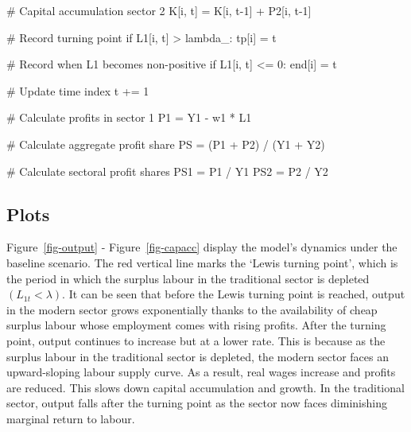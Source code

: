 \documentclass[
  letterpaper,
  DIV=11,
  numbers=noendperiod]{scrreprt}
\newenvironment{Shaded}{\begin{snugshade}}{\end{snugshade}}
\newcommand{\CommentTok}[1]{\textcolor[rgb]{0.37,0.37,0.37}{#1}}
\newcommand{\ControlFlowTok}[1]{\textcolor[rgb]{0.00,0.23,0.31}{#1}}
\newcommand{\DecValTok}[1]{\textcolor[rgb]{0.68,0.00,0.00}{#1}}
\newcommand{\NormalTok}[1]{\textcolor[rgb]{0.00,0.23,0.31}{#1}}
\newcommand{\OperatorTok}[1]{\textcolor[rgb]{0.37,0.37,0.37}{#1}}
\begin{document}
\begin{tcolorbox}
\begin{Shaded}
\begin{Highlighting}[]
            \CommentTok{\# Capital accumulation sector 2}
\NormalTok{            K[i, t] }\OperatorTok{=}\NormalTok{ K[i, t}\OperatorTok{{-}}\DecValTok{1}\NormalTok{] }\OperatorTok{+}\NormalTok{ P2[i, t}\OperatorTok{{-}}\DecValTok{1}\NormalTok{]}

        \CommentTok{\# Record turning point}
        \ControlFlowTok{if}\NormalTok{ L1[i, t] }\OperatorTok{\textgreater{}}\NormalTok{ lambda\_:}
\NormalTok{            tp[i] }\OperatorTok{=}\NormalTok{ t}

        \CommentTok{\# Record when L1 becomes non{-}positive}
        \ControlFlowTok{if}\NormalTok{ L1[i, t] }\OperatorTok{\textless{}=} \DecValTok{0}\NormalTok{:}
\NormalTok{            end[i] }\OperatorTok{=}\NormalTok{ t}

        \CommentTok{\# Update time index}
\NormalTok{        t }\OperatorTok{+=} \DecValTok{1}

\CommentTok{\# Calculate profits in sector 1}
\NormalTok{P1 }\OperatorTok{=}\NormalTok{ Y1 }\OperatorTok{{-}}\NormalTok{ w1 }\OperatorTok{*}\NormalTok{ L1}

\CommentTok{\# Calculate aggregate profit share}
\NormalTok{PS }\OperatorTok{=}\NormalTok{ (P1 }\OperatorTok{+}\NormalTok{ P2) }\OperatorTok{/}\NormalTok{ (Y1 }\OperatorTok{+}\NormalTok{ Y2)}

\CommentTok{\# Calculate sectoral profit shares}
\NormalTok{PS1 }\OperatorTok{=}\NormalTok{ P1 }\OperatorTok{/}\NormalTok{ Y1}
\NormalTok{PS2 }\OperatorTok{=}\NormalTok{ P2 }\OperatorTok{/}\NormalTok{ Y2}
\end{Highlighting}
\end{Shaded}

\end{tcolorbox}

\subsection{Plots}\label{plots-12}

Figure~\ref{fig-output} - Figure~\ref{fig-capacc} display the model's
dynamics under the baseline scenario. The red vertical line marks the
`Lewis turning point', which is the period in which the surplus labour
in the traditional sector is depleted \((L_{1t}<\lambda)\). It can be
seen that before the Lewis turning point is reached, output in the
modern sector grows exponentially thanks to the availability of cheap
surplus labour whose employment comes with rising profits. After the
turning point, output continues to increase but at a lower rate. This is
because as the surplus labour in the traditional sector is depleted, the
modern sector faces an upward-sloping labour supply curve. As a result,
real wages increase and profits are reduced. This slows down capital
accumulation and growth. In the traditional sector, output falls after
the turning point as the sector now faces diminishing marginal return to
labour.
\end{document}
